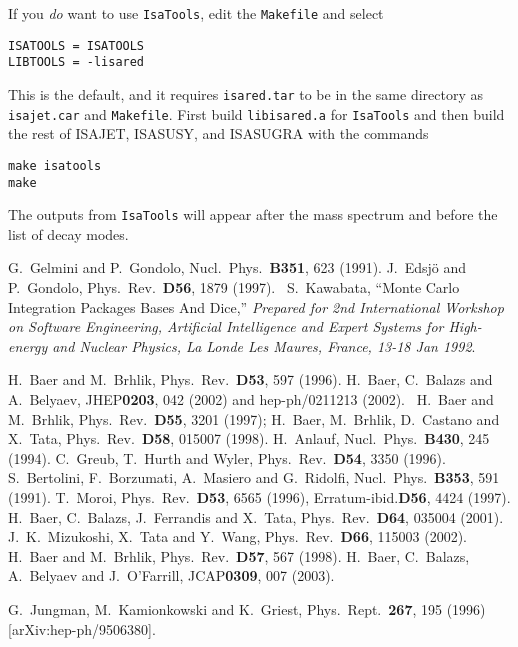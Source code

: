 If you {\it do} want to use \verb|IsaTools|, edit the \verb|Makefile|
and select
\begin{verbatim}
ISATOOLS = ISATOOLS
LIBTOOLS = -lisared
\end{verbatim}
This is the default, and it requires \verb|isared.tar| to be in the same
directory as \verb|isajet.car| and \verb|Makefile|. First build
\verb|libisared.a| for \verb|IsaTools| and then build the rest of
ISAJET, ISASUSY, and ISASUGRA with the commands
\begin{verbatim}
make isatools
make
\end{verbatim}
The outputs from \verb|IsaTools| will appear after the mass spectrum and
before the list of decay modes.

\def\refname{\large\bf References for IsaTools}
\begin{thebibliography}{99}
%
 G.\ Gelmini and P.\ Gondolo, Nucl.\ Phys.\ {\bf B351}, 623 (1991).
%
 J.\ Edsj\"o and P.\ Gondolo, Phys.\ Rev.\ {\bf D56}, 1879 (1997).\ 
%
 S.~Kawabata,
``Monte Carlo Integration Packages Bases And Dice,''
{\it Prepared for 2nd International Workshop on Software Engineering, 
Artificial Intelligence and Expert Systems for High-energy and Nuclear
Physics, La Londe Les Maures, France, 13-18 Jan 1992}.

 H.\ Baer and M.\ Brhlik, Phys.\ Rev.\ {\bf D53}, 597 (1996).
%
 H.\ Baer, C.\ Balazs and A.\ Belyaev,
JHEP{\bf 0203}, 042 (2002) and hep-ph/0211213 (2002).\ 
%
 H.\ Baer and M.\ Brhlik, Phys.\ Rev.\ {\bf D55}, 3201 (1997);
H.\ Baer, M.\ Brhlik, D.\ Castano and X.\ Tata, 
Phys.\ Rev.\ {\bf D58}, 015007 (1998).
%
 H.\ Anlauf, Nucl.\ Phys.\ {\bf B430}, 245 (1994).
%
\bibitem{greub} C.\ Greub, T.\ Hurth and Wyler, 
Phys.\ Rev.\ {\bf D54}, 3350 (1996).
%
 S.\ Bertolini, F.\ Borzumati, A.\ Masiero and G.\ Ridolfi, 
Nucl.\ Phys.\ {\bf B353}, 591 (1991).
%
 T.\ Moroi, Phys.\ Rev.\ {\bf D53}, 6565 (1996),
Erratum-ibid.{\bf D56}, 4424 (1997).
%
 H.\ Baer, C.\ Balazs, J.\ Ferrandis and X.\ Tata,
Phys.\ Rev.\ {\bf D64}, 035004 (2001).
%
 J.\ K.\ Mizukoshi, X.\ Tata and Y.\ Wang, 
Phys.\ Rev.\ {\bf D66}, 115003 (2002).
%
 H.\ Baer and M.\ Brhlik, Phys.\ Rev.\ {\bf D57}, 567 (1998).
%
\bibitem{bbbo} H.\ Baer, C.\ Balazs, A.\ Belyaev and J.\ O'Farrill, 
JCAP{\bf 0309}, 007 (2003).

G.~Jungman, M.~Kamionkowski and K.~Griest,
Phys.\ Rept.\  {\bf 267}, 195 (1996)
[arXiv:hep-ph/9506380].


\end{thebibliography}

